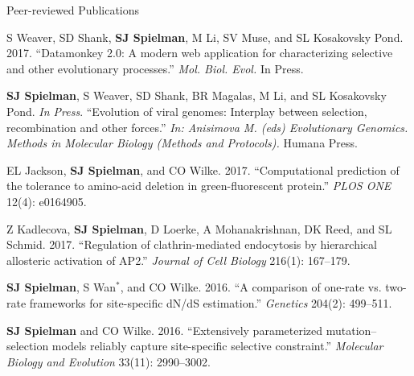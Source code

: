 \documentclass{resume} %
\begin{document}
\vspace*{0.35cm}
\begin{rSection}{Peer-reviewed Publications}
\vspace*{0.25cm}

\begin{etaremune}[leftmargin=1.5em]

\item S Weaver, SD Shank, \textbf{SJ Spielman}, M Li, SV Muse, and SL Kosakovsky Pond. 2017. ``Datamonkey 2.0: A modern web application for characterizing selective and other evolutionary processes.'' \emph{Mol. Biol. Evol.} In Press. \\

\item \textbf{SJ Spielman}, S Weaver, SD Shank, BR Magalas, M Li, and SL Kosakovsky Pond. \emph{In Press}. ``Evolution of viral genomes: Interplay between selection,
recombination and other forces.'' \emph{In: Anisimova M. (eds) Evolutionary Genomics. Methods in Molecular Biology (Methods and Protocols).} Humana Press.

\item EL Jackson, \textbf{SJ Spielman}, and CO Wilke. 2017. ``Computational prediction of the tolerance to amino-acid deletion in green-fluorescent protein.'' \emph{PLOS ONE} 12(4): e0164905. \\

\item Z Kadlecova, \textbf{SJ Spielman}, D Loerke, A Mohanakrishnan, DK Reed, and SL Schmid. 2017. ``Regulation of clathrin-mediated endocytosis by hierarchical allosteric activation of AP2.'' \emph{Journal of Cell Biology} 216(1): 167--179. \\

\item \textbf{SJ Spielman}, S Wan$^\ast$, and CO Wilke. 2016. ``A comparison of one-rate vs. two-rate frameworks for site-specific dN/dS estimation.'' \emph{Genetics} 204(2): 499--511.\\


\item \textbf{SJ Spielman} and CO Wilke. 2016. ``Extensively parameterized mutation--selection models reliably capture site-specific selective constraint.'' \emph{Molecular Biology and Evolution} 33(11): 2990--3002.\\



\end{etaremune}
\end{rSection}
\end{document}
